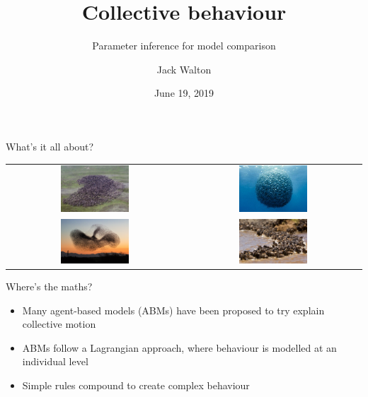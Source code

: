 \documentclass[12pt]{beamer}
\title{Collective behaviour}
\subtitle{Parameter inference for model comparison}
\author{Jack Walton}
\date{June 19, 2019}
\institute{Newcastle University}
\renewcommand{\emph}[1]{{\color{mLightBrown}#1}}
\begin{document}
\maketitle

\begin{frame}{What's it all about?}
    \centering
    \vspace{0.85cm}
    \renewcommand{\arraystretch}{2.4}
    \begin{tabular}{@{}cc@{}}
	\includegraphics[width=0.4\textwidth]{caribou.jpg} &
        \includegraphics[width=0.4\textwidth]{milling_fish.jpg} \\
    	\includegraphics[width=0.4\textwidth]{starling_murmuration.jpg} &
        \includegraphics[width=0.4\textwidth]{wildebeest.jpg}
    \end{tabular}
\end{frame}

\begin{frame}{Where's the maths?}
    \begin{itemize}
        \setlength\itemsep{1em}
        \item Many \emph{agent-based models} (ABMs) have been proposed to try explain collective
            motion
        \item ABMs follow a \emph{Lagrangian} approach, where behaviour is modelled at an individual
            level
        \item \alert{Simple rules} compound to create \alert{complex behaviour}
    \end{itemize}
\end{frame}
\end{document}

